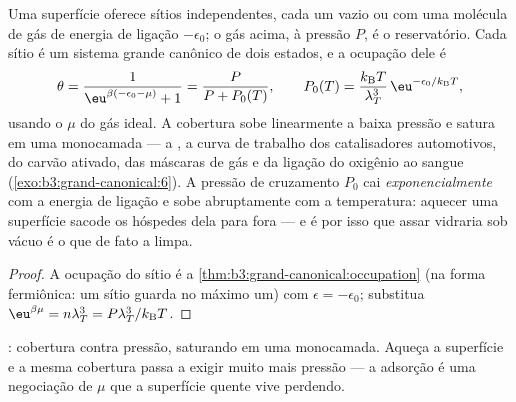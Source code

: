 \begin{proposition}\label{prop:b3:grand-canonical:langmuir}
Uma superfície oferece sítios independentes, cada um vazio ou com uma
molécula de gás de energia de ligação $-\epsilon_0$; o gás acima, à
pressão $P$, é o reservatório. Cada sítio é um sistema grande canônico
de dois estados, e a ocupação dele é
\[
\theta = \frac{1}{\eu^{\beta(-\epsilon_0 - \mu)} + 1}
 = \frac{P}{P + P_0(T)} , \qquad
P_0(T) = \frac{k_{\text{B}}T}{\lambda_T^3}\,
\eu^{-\epsilon_0/k_{\text{B}}T} ,
\]
usando o $\mu$ do gás ideal. A cobertura sobe linearmente a baixa
pressão e satura em uma monocamada --- a \emph{},
a curva de trabalho dos catalisadores automotivos, do carvão ativado,
das máscaras de gás e da ligação do oxigênio ao sangue
(\cref{exo:b3:grand-canonical:6}). A pressão de cruzamento $P_0$ cai
\emph{exponencialmente} com a energia de ligação e sobe abruptamente com
a temperatura: aquecer uma superfície sacode os hóspedes dela para fora
--- e é por isso que assar vidraria sob vácuo é o que de fato a limpa.
\end{proposition}

\begin{proof}
A ocupação do sítio é a
\cref{thm:b3:grand-canonical:occupation} (na forma fermiônica: um sítio
guarda no máximo um) com $\epsilon = -\epsilon_0$; substitua
$\eu^{\beta\mu} = n\lambda_T^3 = P\lambda_T^3/k_{\text{B}}T$.
\end{proof}

\begin{omfigure}

{\small {}: cobertura contra pressão, saturando em
uma monocamada. Aqueça a superfície e a mesma cobertura passa a exigir
muito mais pressão --- a adsorção é uma negociação de $\mu$ que a
superfície quente vive perdendo.}
\end{omfigure}

